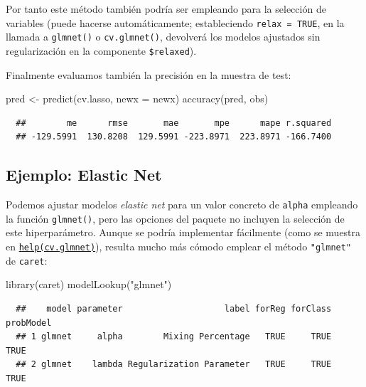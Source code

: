 \documentclass[
]{book}
\newenvironment{Shaded}{\begin{snugshade}}{\end{snugshade}}
\newcommand{\AttributeTok}[1]{\textcolor[rgb]{0.77,0.63,0.00}{#1}}
\newcommand{\FunctionTok}[1]{\textcolor[rgb]{0.00,0.00,0.00}{#1}}
\newcommand{\NormalTok}[1]{#1}
\newcommand{\OtherTok}[1]{\textcolor[rgb]{0.56,0.35,0.01}{#1}}
\newcommand{\StringTok}[1]{\textcolor[rgb]{0.31,0.60,0.02}{#1}}
\theoremstyle{break}
\theoremstyle{nonumberplain}
\begin{document}
Por tanto este método también podría ser empleando para la selección de variables (puede hacerse automáticamente; estableciendo \texttt{relax\ =\ TRUE}, en la llamada a \texttt{glmnet()} o \texttt{cv.glmnet()}, devolverá los modelos ajustados sin regularización en la componente \texttt{\$relaxed}).

Finalmente evaluamos también la precisión en la muestra de test:

\begin{Shaded}
\begin{Highlighting}[]
\NormalTok{pred }\OtherTok{\textless{}{-}} \FunctionTok{predict}\NormalTok{(cv.lasso, }\AttributeTok{newx =}\NormalTok{ newx)}
\FunctionTok{accuracy}\NormalTok{(pred, obs)}
\end{Highlighting}
\end{Shaded}

\begin{verbatim}
  ##        me      rmse       mae       mpe      mape r.squared 
  ## -129.5991  130.8208  129.5991 -223.8971  223.8971 -166.7400
\end{verbatim}

\hypertarget{ejemplo-elastic-net}{%
\subsection{Ejemplo: Elastic Net}\label{ejemplo-elastic-net}}

Podemos ajustar modelos \emph{elastic net} para un valor concreto de \texttt{alpha} empleando la función \texttt{glmnet()}, pero las opciones del paquete no incluyen la selección de este hiperparámetro.
Aunque se podría implementar fácilmente (como se muestra en \href{https://glmnet.stanford.edu/reference/cv.glmnet.html}{\texttt{help(cv.glmnet)}}), resulta mucho más cómodo emplear el método \texttt{"glmnet"} de \texttt{caret}:

\begin{Shaded}
\begin{Highlighting}[]
\FunctionTok{library}\NormalTok{(caret)}
\FunctionTok{modelLookup}\NormalTok{(}\StringTok{"glmnet"}\NormalTok{) }
\end{Highlighting}
\end{Shaded}

\begin{verbatim}
  ##    model parameter                    label forReg forClass probModel
  ## 1 glmnet     alpha        Mixing Percentage   TRUE     TRUE      TRUE
  ## 2 glmnet    lambda Regularization Parameter   TRUE     TRUE      TRUE
\end{verbatim}
\end{document}
